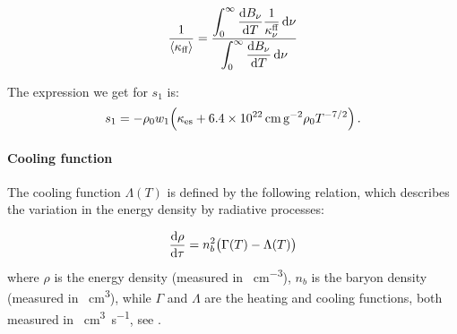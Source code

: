 \documentclass[main.tex]{subfiles}
\begin{document}
\begin{equation}
  \frac{1}{\expval{\kappa_{\text{ff}}}} =
  \frac{ \displaystyle\int _{0}   ^{\infty}  \dv{B_\nu}{T} \frac{1}{\kappa_\nu^{\text{ff}}} \dd{\nu}}
  {  \displaystyle \int _{0}   ^{\infty} \dv{B_\nu}{T} \dd{\nu}}
\end{equation}

The expression we get for \(s_1\) is:
\begin{equation}
  s_1 = - \rho_0 w_1 \qty(\kappa_{\text{es}} + \SI{6.4e22}{\centi\metre\square\per\gram} \rho_0 T^{-7/2}) \,.
\end{equation}

\paragraph{Cooling function}

The cooling function \(\Lambda (T)\) is defined by the following relation, which describes the variation in the energy density by radiative processes:

\begin{equation}
    \dv{\rho}{\tau} = n^2_b \qty(\Gamma(T) - \Lambda (T))
\end{equation}
where \(\rho\) is the energy density (measured in \si{\erg\per\cubic\centi\metre}), \(n_b\) is the baryon density (measured in \si{\per\cubic\centi\metre}), while \(\Gamma\) and \(\Lambda\) are the heating and cooling functions, both measured in \si{\erg\cubic\centi\metre\per\second}, see \cite[equation 1]{GnedinHollon:2012}.
\end{document}
